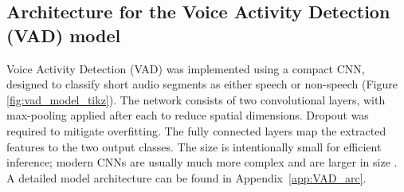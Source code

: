 \subsection{Architecture for the Voice Activity Detection (VAD) model}
Voice Activity Detection (VAD) was implemented using a compact CNN, designed to classify short audio segments as either speech or non-speech (Figure \ref{fig:vad_model_tikz}). The network consists of two convolutional layers, with max-pooling applied after each to reduce spatial dimensions. Dropout was required to mitigate overfitting. The fully connected layers map the extracted features to the two output classes. The size is intentionally small for efficient inference; modern CNNs are usually much more complex and are larger in size \cite{modelsizes}. A detailed model architecture can be found in Appendix~\ref{app:VAD_arc}.

